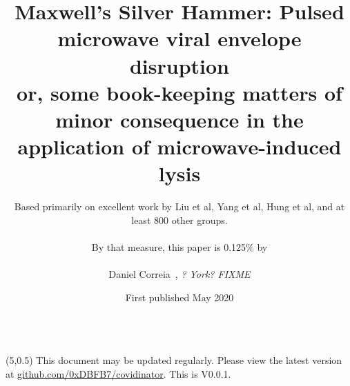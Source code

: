 \documentclass[paper.tex]{subfiles}
\begin{document}


\title{Maxwell's Silver Hammer: Pulsed microwave viral envelope disruption\footnotemark\\or, some book-keeping matters of minor consequence in the application of microwave-induced lysis}
\date{First published May 2020}
\author{Based primarily on excellent work by Liu et al, Yang et al, Hung et al, and at least 800 other groups.\\
	\\
		By that measure, this paper is 0.125\% by \\
		\\
		\small{{Daniel Correia}\ , \textit{? York? FIXME}\footnotemark}}



\flushbottom 
\maketitle
\thispagestyle{empty}


\null\begin{tabular}[t]{l@{}}
	  \\
	
\end{tabular}


\begin{textblock}{10}(5,0.5)
\noindent This document may be updated regularly. Please view the latest version at \href{https://www.github.com/0xDBFB7/covidinator}{github.com/0xDBFB7/covidinator}. This is V0.0.1.
\end{textblock}
\end{document}
